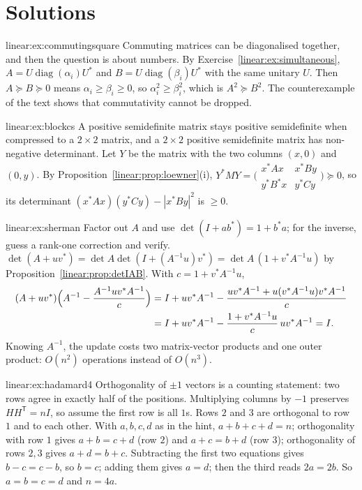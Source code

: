 \section{Solutions}

\begin{solution}{linear:ex:commutingsquare}
\idea Commuting matrices can be diagonalised together, and then the question is about numbers.
\writeup By Exercise~\ref{linear:ex:simultaneous}, $A=U\operatorname{diag}(\alpha_i)U^*$ and $B=U\operatorname{diag}(\beta_i)U^*$ with the same
unitary $U$. Then $A\succeq B\succeq0$ means $\alpha_i\ge\beta_i\ge0$, so $\alpha_i^2\ge\beta_i^2$, which is $A^2\succeq B^2$. The
counterexample of the text shows that commutativity cannot be dropped.
\end{solution}

\begin{solution}{linear:ex:blockcs}
\idea A positive semidefinite matrix stays positive semidefinite when compressed to a $2\times2$ matrix, and a $2\times2$ positive
semidefinite matrix has non-negative determinant.
\writeup Let $Y$ be the matrix with the two columns $(x,0)$ and $(0,y)$. By Proposition~\ref{linear:prop:loewner}(i), $Y^*MY=\bigl(\begin{smallmatrix}
x^*Ax&x^*By\\y^*B^*x&y^*Cy\end{smallmatrix}\bigr)\succeq0$, so its determinant $(x^*Ax)(y^*Cy)-|x^*By|^2$ is $\ge0$.
\end{solution}

\begin{solution}{linear:ex:sherman}
\idea Factor out $A$ and use $\det(I+ab^*)=1+b^*a$; for the inverse, guess a rank-one correction and verify.
\writeup $\det(A+uv^*)=\det A\det(I+(A^{-1}u)v^*)=\det A\,(1+v^*A^{-1}u)$ by Proposition~\ref{linear:prop:detIAB}. With $c=1+v^*A^{-1}u$,
\[
\begin{aligned}
(A+uv^*)\Bigl(A^{-1}-\frac{A^{-1}uv^*A^{-1}}c\Bigr)&=I+uv^*A^{-1}-\frac{uv^*A^{-1}+u(v^*A^{-1}u)v^*A^{-1}}c\\
&=I+uv^*A^{-1}-\frac{1+v^*A^{-1}u}c\,uv^*A^{-1}=I.
\end{aligned}
\]
Knowing $A^{-1}$, the update costs two matrix-vector products and one outer product: $O(n^2)$ operations instead of $O(n^3)$.
\end{solution}

\begin{solution}{linear:ex:hadamard4}
\idea Orthogonality of $\pm1$ vectors is a counting statement: two rows agree in exactly half of the positions.
\writeup Multiplying columns by $-1$ preserves $HH^{\mathsf T}=nI$, so assume the first row is all $1$s. Rows $2$ and $3$ are orthogonal to
row $1$ and to each other. With $a,b,c,d$ as in the hint, $a+b+c+d=n$; orthogonality with row $1$ gives $a+b=c+d$ (row $2$) and $a+c=
b+d$ (row $3$); orthogonality of rows $2,3$ gives $a+d=b+c$. Subtracting the first two equations gives $b-c=c-b$, so $b=c$; adding them gives $a=d$; then
the third reads $2a=2b$. So $a=b=c=d$ and $n=4a$.
\end{solution}

